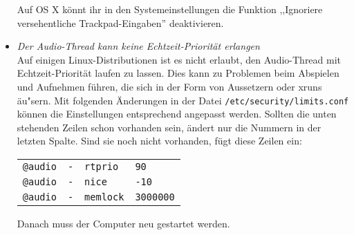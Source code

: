 \begin{itemize}
  Auf OS X könnt ihr in den Systemeinstellungen die Funktion ,,Ignoriere versehentliche Trackpad-Eingaben'' deaktivieren.

 \item \textit{Der Audio-Thread kann keine Echtzeit-Priorität erlangen}\\
Auf einigen Linux-Distributionen ist es nicht erlaubt, den Audio-Thread mit Echtzeit-Priorität laufen zu lassen. Dies kann zu Problemen beim Abspielen und Aufnehmen führen, die sich in der Form von Aussetzern oder xruns äu"sern. Mit folgenden Änderungen in der Datei \texttt{/etc/security/limits.conf} können die Einstellungen entsprechend angepasst werden. Sollten die unten stehenden Zeilen schon vorhanden sein, ändert nur die Nummern in der letzten Spalte. Sind sie noch nicht vorhanden, fügt diese Zeilen ein:

\begin{tabular}{llll}
\texttt{@audio} & \texttt{-} & \texttt{rtprio} & \texttt{90}\\
\texttt{@audio} & \texttt{-} & \texttt{nice} & \texttt{-10}\\
\texttt{@audio} & \texttt{-} & \texttt{memlock} & \texttt{3000000}\\
\end{tabular}

Danach muss der Computer neu gestartet werden.

\end{itemize}


